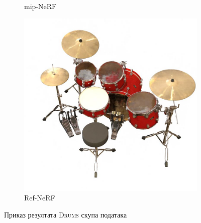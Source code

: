 \documentclass[12pt, a4paper, twoside]{book}
\numberwithin{equation}{chapter}
\numberwithin{theorem}{section}
\numberwithin{definition}{section}
\numberwithin{definitionChapter}{chapter}
\begin{document}
\begin{figure}[H]
\begin{subfigure}{0.3\textwidth}
			\caption{mip-NeRF}
		\end{subfigure}
		\begin{subfigure}{0.3\textwidth}
			\centering
			\includegraphics[scale=0.2]{img/refnerf/refnerf_drums_3.jpg}
			\caption{Ref-NeRF}
		\end{subfigure}
		\caption{Приказ резултата \textsc{Drums} скупа података}
		\label{fig-drums-results}
	\end{figure}
\end{document}
